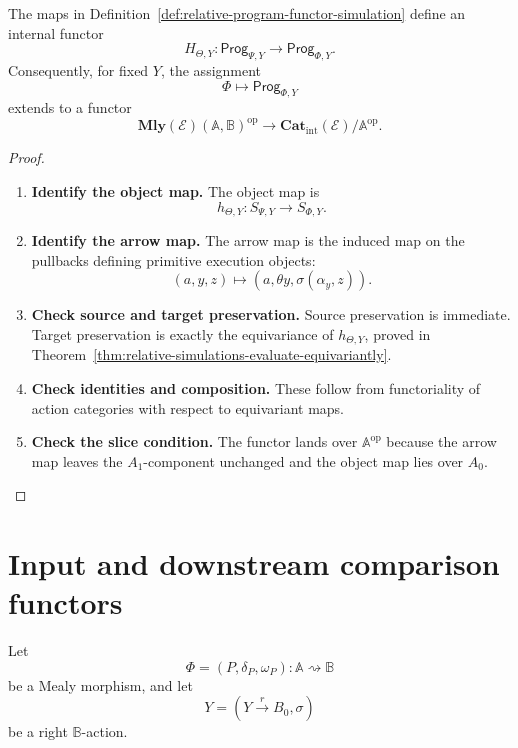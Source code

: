 \begin{theorem}
\label{thm:relative-simulations-program-functors}
The maps in Definition~\ref{def:relative-program-functor-simulation} define an
internal functor
\[
H_{\Theta,Y}:
\mathsf{Prog}_{\Psi,Y}
\to
\mathsf{Prog}_{\Phi,Y}.
\]
Consequently, for fixed \(Y\), the assignment
\[
\Phi\longmapsto\mathsf{Prog}_{\Phi,Y}
\]
extends to a functor
\[
\mathbf{Mly}(\mathcal E)(\mathbb A,\mathbb B)^{\mathrm{op}}
\longrightarrow
\mathbf{Cat}_{\mathrm{int}}(\mathcal E)/\mathbb A^{\mathrm{op}}.
\]
\end{theorem}

\begin{proof}
\leavevmode
\begin{enumerate}
\item \textbf{Identify the object map.}
The object map is
\[
h_{\Theta,Y}:S_{\Psi,Y}\to S_{\Phi,Y}.
\]

\item \textbf{Identify the arrow map.}
The arrow map is the induced map on the pullbacks defining primitive execution
objects:
\[
(a,y,z)\longmapsto
(a,\theta y,\sigma(\alpha_y,z)).
\]

\item \textbf{Check source and target preservation.}
Source preservation is immediate. Target preservation is exactly the
equivariance of \(h_{\Theta,Y}\), proved in
Theorem~\ref{thm:relative-simulations-evaluate-equivariantly}.

\item \textbf{Check identities and composition.}
These follow from functoriality of action categories with respect to
equivariant maps.

\item \textbf{Check the slice condition.}
The functor lands over \(\mathbb A^{\mathrm{op}}\) because the arrow map leaves
the \(A_1\)-component unchanged and the object map lies over \(A_0\).
\end{enumerate}
\end{proof}

\section{Input and downstream comparison functors}
\label{sec:relative-input-downstream-comparison}

Let
\[
\Phi=(P,\delta_P,\omega_P):\mathbb A\rightsquigarrow\mathbb B
\]
be a Mealy morphism, and let
\[
Y=(Y\xrightarrow{r}B_0,\sigma)
\]
be a right \(\mathbb B\)-action.

